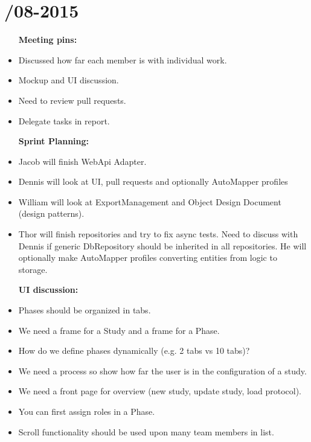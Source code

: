 \section{/08-2015} %
\attend{\at}{\at}{\at}{\at}


\begin{itemize}
	\item [\textbf{Meeting pins:}]
	\item Discussed how far each member is with individual work.
	\item Mockup and UI discussion. 
	\item Need to review pull requests. 
	\item Delegate tasks in report. 
\end{itemize}

\begin{itemize}
	\item [\textbf{Sprint Planning:}]
	\item Jacob will finish WebApi Adapter.
	\item Dennis will look at UI, pull requests and optionally AutoMapper profiles
	\item William will look at ExportManagement and Object Design Document (design patterns).
	\item Thor will finish repositories and try to fix async tests. Need to discuss with Dennis if generic DbRepository should be inherited in all repositories. He will optionally make AutoMapper profiles converting entities from logic to storage.  
\end{itemize}

\begin{itemize}
	\item [\textbf{UI discussion:}]
	\item Phases should be organized in tabs.
	\item We need a frame for a Study and a frame for a Phase.
	\item How do we define phases dynamically (e.g. 2 tabs vs 10 tabs)?
	\item We need a process so show how far the user is in the configuration of a study.
	\item We need a front page for overview (new study, update study, load protocol).
	\item You can first assign roles in a Phase. 
	\item Scroll functionality should be used upon many team members in list. 
\end{itemize}
